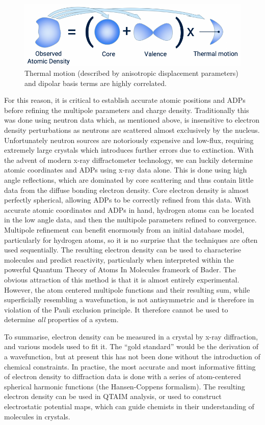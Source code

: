 \begin{refsection}
\begin{figure}
    \centering
    \includegraphics[width=0.6\linewidth]{Figures/valencevsthermaled.pdf}
    \caption[Correlation of thermal and dipolar functions.]{Thermal motion (described by anisotropic displacement parameters) and dipolar basis terms are highly correlated.}
    \label{fig:adp-dipole}
\end{figure}

For this reason, it is critical to establish accurate atomic positions and ADPs before refining the multipole parameters and charge density.
Traditionally this was done using neutron data which, as mentioned above, is insensitive to electron density perturbations as neutrons are scattered almost exclusively by the nucleus.
Unfortunately neutron sources are notoriously expensive and low-flux, requiring extremely large crystals which introduces further errors due to extinction.
With the advent of modern x-ray diffractometer technology, we can luckily determine atomic coordinates and ADPs using x-ray data alone.
This is done using high angle reflections, which are dominated by core scattering and thus contain little data from the diffuse bonding electron density.
Core electron density is almost perfectly spherical, allowing ADPs to be correctly refined from this data.
With accurate atomic coordinates and ADPs in hand, hydrogen atoms can be located in the low angle data, and then the multipole parameters refined to convergence.
Multipole refinement can benefit enormously from an initial database model, particularly for hydrogen atoms, so it is no surprise that the techniques are often used sequentially.\autocite{Guillot2001,Volkov2006}
The resulting electron density can be used to characterise molecules and predict reactivity, particularly when interpreted within the powerful Quantum Theory of Atoms In Molecules frameork of Bader.\autocite{Bader1991}
The obvious attraction of this method is that it is almost entirely experimental.
However, the atom centered multipole functions and their resulting sum, while superficially resembling a wavefunction, is not antisymmetric and is therefore in violation of the Pauli exclusion principle.
It therefore cannot be used to determine \emph{all} properties of a system.

To summarise, electron density can be measured in a crystal by x-ray diffraction, and various models used to fit it.
The ``gold standard'' would be the derivation of a wavefunction, but at present this has not been done without the introduction of chemical constraints.
In practise, the most accurate and most informative fitting of electron density to diffraction data is done with a series of atom-centered spherical harmonic functions (the Hansen-Coppens formalism).
The resulting electron density can be used in QTAIM analysis, or used to construct electrostatic potential maps, which can guide chemists in their understanding of molecules in crystals.


\end{refsection}
